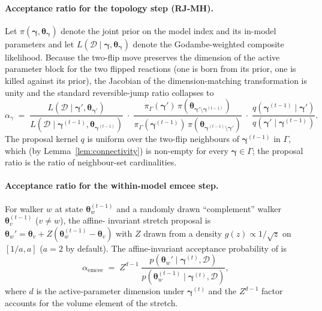\documentclass[12pt]{article}
\theoremstyle{plain}
\theoremstyle{definition}
\theoremstyle{remark}
\begin{document}
\paragraph{Acceptance ratio for the topology step (RJ-MH).}
Let $\pi(\boldsymbol\gamma,\boldsymbol\theta_{\boldsymbol\gamma})$ denote the
joint prior on the model index and its in-model parameters and let
$L(\mathcal{D}\mid\boldsymbol\gamma,\boldsymbol\theta_{\boldsymbol\gamma})$
denote the Godambe-weighted composite likelihood.  Because the two-flip move
preserves the dimension of the active parameter block for the two flipped
reactions (one is born from its prior, one is killed against its prior), the
Jacobian of the dimension-matching transformation is unity and the standard
reversible-jump ratio collapses to
%
\begin{equation}
\alpha_\gamma \;=\;
  \frac{L(\mathcal{D}\mid\boldsymbol\gamma',\boldsymbol\theta_{\boldsymbol\gamma'})}
       {L(\mathcal{D}\mid\boldsymbol\gamma^{(t-1)},\boldsymbol\theta_{\boldsymbol\gamma^{(t-1)}})}\;
  \cdot\;
  \frac{\pi_\Gamma(\boldsymbol\gamma')\,\pi(\boldsymbol\theta_{\boldsymbol\gamma'\setminus\boldsymbol\gamma^{(t-1)}})}
       {\pi_\Gamma(\boldsymbol\gamma^{(t-1)})\,\pi(\boldsymbol\theta_{\boldsymbol\gamma^{(t-1)}\setminus\boldsymbol\gamma'})}\;
  \cdot\;
  \frac{q(\boldsymbol\gamma^{(t-1)}\mid\boldsymbol\gamma')}
       {q(\boldsymbol\gamma'\mid\boldsymbol\gamma^{(t-1)})}.
\label{eq:alpha_gamma}
\end{equation}
%
The proposal kernel $q$ is uniform over the two-flip neighbours of
$\boldsymbol\gamma^{(t-1)}$ in $\Gamma$, which (by
Lemma~\ref{lem:connectivity}) is non-empty for every $\boldsymbol\gamma\in\Gamma$;
the proposal ratio is the ratio of neighbour-set cardinalities.

\paragraph{Acceptance ratio for the within-model emcee step.}
For walker $w$ at state $\boldsymbol\theta_w^{(t-1)}$ and a randomly drawn
``complement'' walker $\boldsymbol\theta_v^{(t-1)}$ ($v\ne w$), the affine-
invariant stretch proposal is
$\boldsymbol\theta_w' = \boldsymbol\theta_v + Z(\boldsymbol\theta_w^{(t-1)}-\boldsymbol\theta_v)$
with $Z$ drawn from a density $g(z)\propto 1/\sqrt{z}$ on $[1/a,a]$
($a=2$ by default).  The affine-invariant acceptance probability of
\citet{Goodman2010} is
%
\begin{equation}
\alpha_{\mathrm{emcee}} \;=\;
  Z^{d-1}\;
  \frac{p\!\left(\boldsymbol\theta_w' \mid \boldsymbol\gamma^{(t)},\mathcal{D}\right)}
       {p\!\left(\boldsymbol\theta_w^{(t-1)} \mid \boldsymbol\gamma^{(t)},\mathcal{D}\right)},
\label{eq:alpha_emcee}
\end{equation}
%
where $d$ is the active-parameter dimension under $\boldsymbol\gamma^{(t)}$ and
the $Z^{d-1}$ factor accounts for the volume element of the stretch.
\end{document}
